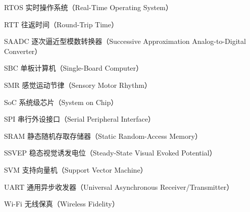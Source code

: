 \begin{denotation}
\item[RTOS] 实时操作系统（Real-Time Operating System）
\item[RTT] 往返时间（Round-Trip Time）
\item[SAADC] 逐次逼近型模数转换器（Successive Approximation Analog-to-Digital Converter）
\item[SBC] 单板计算机（Single-Board Computer）
\item[SMR] 感觉运动节律（Sensory Motor Rhythm）
\item[SoC] 系统级芯片（System on Chip）
\item[SPI] 串行外设接口（Serial Peripheral Interface）
\item[SRAM] 静态随机存取存储器（Static Random-Access Memory）
\item[SSVEP] 稳态视觉诱发电位（Steady-State Visual Evoked Potential）
\item[SVM] 支持向量机（Support Vector Machine）
\item[UART] 通用异步收发器（Universal Asynchronous Receiver/Transmitter）
\item[Wi-Fi] 无线保真（Wireless Fidelity）

\end{denotation}
